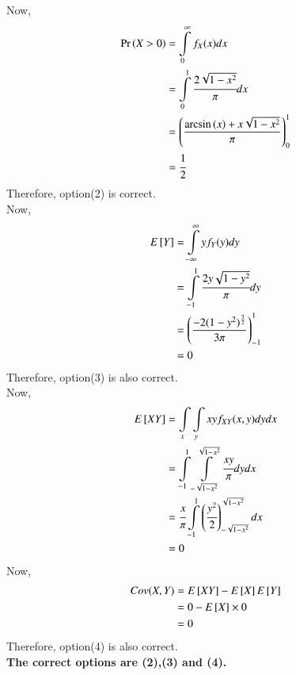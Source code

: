 \documentclass[journal,12pt,twocolumn]{IEEEtran}
\begin{document}
Now,
\begin{align}
    \Pr\left(X>0\right)&=\displaystyle\int\limits_{0}^{\infty}f_X(x)dx\\
    &=\displaystyle\int\limits_{0}^{1}\cfrac{2\sqrt{1-x^2}}{\pi} dx\\
    &=\left(\frac{\arcsin{(x)}+x\sqrt{1-x^2}}{\pi}\right)_{0}^{1}\\
    &=\cfrac{1}{2}
\end{align}
Therefore, option(2) is correct.\\

Now,
\begin{align}
    E{}\left[Y\right]&=\displaystyle\int\limits_{-\infty}^{\infty}yf_Y(y)dy\\
    &=\displaystyle\int\limits_{-1}^{1}\cfrac{2y\sqrt{1-y^2}}{\pi}dy\\
    &=\left(\frac{-2(1-y^2)^{\frac{3}{2}}}{3\pi}\right)_{-1}^{1}\\
    &=0
\end{align}
Therefore, option(3) is also correct.\\

Now,
\begin{align}
    E{}\left[XY\right]&=\displaystyle\int\limits_{x}\displaystyle\int\limits_{y}xyf_{XY}(x,y)dydx\\
    &=\displaystyle\int\limits_{-1}^{1}\displaystyle\int\limits_{-\sqrt{1-x^2}}^{\sqrt{1-x^2}}\cfrac{xy}{\pi}dydx\\
    &=\cfrac{x}{\pi} \displaystyle\int\limits_{-1}^{1}\left(\cfrac{y^2}{2}\right)_{-\sqrt{1-x^2}}^{\sqrt{1-x^2}}dx\\
    &=0
\end{align}
Now,
\begin{align}
    Cov(X,Y)&=E{}\left[XY\right]-E{}\left[X\right]E{}\left[Y\right]\\
    &=0-E{}\left[X\right]\times0\\
    &=0
\end{align}
Therefore, option(4) is also correct.\\

\textbf{The correct options are (2),(3) and (4).}
\end{document}
